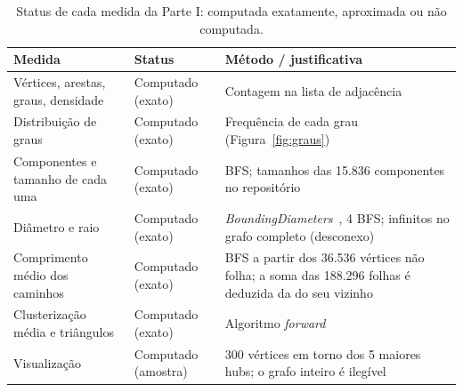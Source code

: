 \begin{table}[t]
  \caption{Status de cada medida da Parte I: computada exatamente, aproximada ou não computada.}
  \label{tab:status}
\small
\begin{tabular}{p{4.3cm}p{3.1cm}p{9.2cm}}
  \toprule
  Medida & Status & Método / justificativa \\
  \midrule
  Vértices, arestas, graus, densidade & Computado (exato) & Contagem na lista de adjacência \\
  Distribuição de graus & Computado (exato) & Frequência de cada grau (Figura~\ref{fig:graus}) \\
  Componentes e tamanho de cada uma & Computado (exato) & BFS; tamanhos das 15.836 componentes no repositório \\
  Diâmetro e raio & Computado (exato) & \emph{BoundingDiameters}~\cite{takes2011}, 4 BFS; infinitos no grafo completo (desconexo) \\
  Comprimento médio dos caminhos & Computado (exato) & BFS a partir dos 36.536 vértices não folha; a soma das 188.296 folhas é deduzida da do seu vizinho \\
  Clusterização média e triângulos & Computado (exato) & Algoritmo \emph{forward}~\cite{schank2005} \\
  Visualização & Computado (amostra) & 300 vértices em torno dos 5 maiores hubs; o grafo inteiro é ilegível \\
  \bottomrule
\end{tabular}
\end{table}
